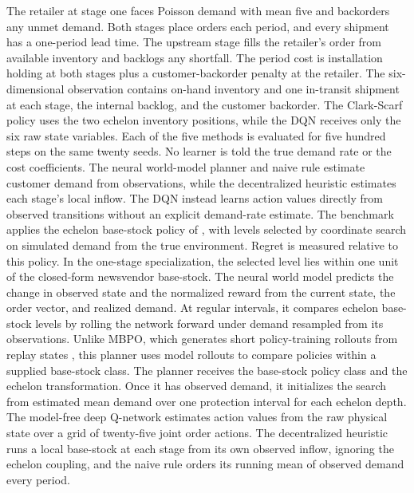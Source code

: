 The retailer at stage one faces Poisson demand with mean five and backorders any unmet demand. Both stages place orders each period, and every shipment has a one-period lead time. The upstream stage fills the retailer's order from available inventory and backlogs any shortfall. The period cost is installation holding at both stages plus a customer-backorder penalty at the retailer. The six-dimensional observation contains on-hand inventory and one in-transit shipment at each stage, the internal backlog, and the customer backorder. The Clark-Scarf policy uses the two echelon inventory positions, while the DQN receives only the six raw state variables. Each of the five methods is evaluated for five hundred steps on the same twenty seeds. No learner is told the true demand rate or the cost coefficients. The neural world-model planner and naive rule estimate customer demand from observations, while the decentralized heuristic estimates each stage's local inflow. The DQN instead learns action values directly from observed transitions without an explicit demand-rate estimate. The benchmark applies the echelon base-stock policy of \citet{ClarkScarf1960inventory}, with levels selected by coordinate search on simulated demand from the true environment. Regret is measured relative to this policy. In the one-stage specialization, the selected level lies within one unit of the closed-form newsvendor base-stock. The neural world model predicts the change in observed state and the normalized reward from the current state, the order vector, and realized demand. At regular intervals, it compares echelon base-stock levels by rolling the network forward under demand resampled from its observations. Unlike MBPO, which generates short policy-training rollouts from replay states \citep{janner2019model}, this planner uses model rollouts to compare policies within a supplied base-stock class. The planner receives the base-stock policy class and the echelon transformation. Once it has observed demand, it initializes the search from estimated mean demand over one protection interval for each echelon depth. The model-free deep Q-network estimates action values from the raw physical state over a grid of twenty-five joint order actions. The decentralized heuristic runs a local base-stock at each stage from its own observed inflow, ignoring the echelon coupling, and the naive rule orders its running mean of observed demand every period.

